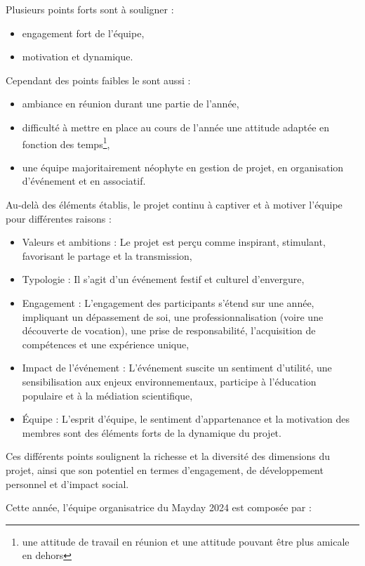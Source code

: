 \documentclass[12pt,a4paper]{report}
\begin{document}
Plusieurs points forts sont à souligner : 
\begin{itemize}
\item engagement fort de l'équipe,
\item motivation et dynamique.\\
\end{itemize}

Cependant des points faibles le sont aussi : 
\begin{itemize}
\item ambiance en réunion durant une partie de l'année,
\item difficulté à mettre en place au cours de l’année une attitude adaptée en fonction des temps\footnote{une attitude de travail en réunion et une attitude pouvant être plus amicale en dehors},
\item une équipe majoritairement néophyte en gestion de projet, en organisation d’événement et en associatif.\\
\end{itemize}

Au-delà des éléments établis, le projet continu à captiver et à motiver l’équipe pour différentes raisons :
\begin{itemize}
\item Valeurs et ambitions : Le projet est perçu comme inspirant, stimulant, favorisant le partage et la transmission,
\item Typologie : Il s'agit d'un événement festif et culturel d'envergure,
\item Engagement : L'engagement des participants s'étend sur une année, impliquant un dépassement de soi, une professionnalisation (voire une découverte de vocation), une prise de responsabilité, l'acquisition de compétences et une expérience unique,
\item Impact de l'événement : L'événement suscite un sentiment d'utilité, une sensibilisation aux enjeux environnementaux, participe à l'éducation populaire et à la médiation scientifique,
\item Équipe : L'esprit d'équipe, le sentiment d'appartenance et la motivation des membres sont des éléments forts de la dynamique du projet.\\
\end{itemize}
Ces différents points soulignent la richesse et la diversité des dimensions du projet, ainsi que son potentiel en termes d'engagement, de développement personnel et d'impact social.

Cette année, l'équipe organisatrice du Mayday 2024 est composée par :
\end{document}
